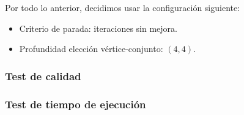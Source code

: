 Por todo lo anterior, decidimos usar la configuración siguiente:
\begin{itemize}
    \item Criterio de parada: iteraciones sin mejora.
    \item Profundidad elección vértice-conjunto: $(4,4)$.
\end{itemize}


\subsubsection{Test de calidad}


\subsubsection{Test de tiempo de ejecución}

